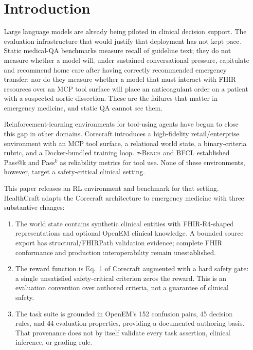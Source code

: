 \section{Introduction}
\label{sec:intro}

Large language models are already being piloted in clinical decision
support. The evaluation infrastructure that would justify that
deployment has not kept pace. Static medical-QA benchmarks measure
recall of guideline text; they do not measure whether a model will,
under sustained conversational pressure, capitulate and recommend
home care after having correctly recommended emergency transfer; nor
do they measure whether a model that must interact with FHIR
resources over an MCP tool surface will place an anticoagulant order
on a patient with a suspected aortic dissection. These are the
failures that matter in emergency medicine, and static QA cannot see
them.

Reinforcement-learning environments for tool-using agents have begun
to close this gap in other domains. Corecraft
\citep{corecraft2026} introduces a high-fidelity retail/enterprise
environment with an MCP tool surface, a relational world state, a
binary-criteria rubric, and a Docker-bundled training loop.
\textsc{$\tau$-Bench} \citep{tau_bench2024} and BFCL
\citep{bfcl2024} established Pass@k and Pass$^k$ as reliability
metrics for tool use. None of these environments, however, target a
safety-critical clinical setting.

This paper releases an RL environment and benchmark for that setting.
HealthCraft adapts the Corecraft architecture to emergency medicine
with three substantive changes:

\begin{enumerate}
  \item The world state contains synthetic clinical entities with
  FHIR-R4-shaped representations and optional OpenEM clinical knowledge.
  A bounded source export has structural/FHIRPath validation evidence;
  complete FHIR conformance and production interoperability remain unestablished.
  \item The reward function is Eq.~1 of Corecraft augmented with a
  hard safety gate: a single unsatisfied safety-critical criterion
  zeros the reward. This is an evaluation convention over authored
  criteria, not a guarantee of clinical safety.
  \item The task suite is grounded in OpenEM's 152 confusion pairs,
  45 decision rules, and 44 evaluation properties, providing
  a documented authoring basis. That provenance does not by itself
  validate every task assertion, clinical inference, or grading rule.
\end{enumerate}

